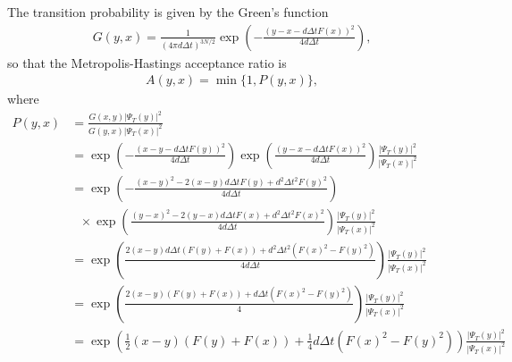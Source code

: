 \documentclass[12pt]{article}
\begin{document}
The transition probability is given by the Green's function
\begin{align}
G(y,x)=\frac{1}{(4\pi d \Delta t)^{3N/2}} \exp \left( -\frac{(y-x-d\Delta t F(x))^2}{4 d \Delta t} \right),
\end{align}
so that the Metropolis-Hastings acceptance ratio is
\begin{align}
A(y,x) = \min \{ 1, P(y,x) \},
\end{align}
where 
\begin{align*}
P(y,x) &= \frac{G(x,y) | \Psi_T(y) | ^2}{G(y,x) | \Psi_T(x) | ^2}\\
&= \exp \left( -\frac{(x-y-d\Delta t F(y))^2}{4 d \Delta t} \right) \exp \left( \frac{(y-x-d\Delta t F(x))^2}{4 d \Delta t} \right) \frac{| \Psi_T(y) | ^2}{ | \Psi_T(x) | ^2}\\
&= \exp \left( -\frac{(x-y)^2-2(x-y)d\Delta t F(y) + d^2 \Delta t^2 F(y)^2}{4d\Delta t} \right)\\
& \ \ \  \times \exp \left( \frac{(y-x)^2-2(y-x)d\Delta t F(x) + d^2 \Delta t^2 F(x)^2}{4d\Delta t} \right) \frac{| \Psi_T(y) | ^2}{ | \Psi_T(x) | ^2}\\
&= \exp \left( \frac{2(x-y)d\Delta t (F(y)+F(x)) + d^2 \Delta t^2 (F(x)^2-F(y)^2)}{4d\Delta t} \right) \frac{| \Psi_T(y) | ^2}{ | \Psi_T(x) | ^2}\\
&= \exp \left( \frac{2(x-y) (F(y)+F(x)) + d \Delta t (F(x)^2-F(y)^2)}{4} \right) \frac{| \Psi_T(y) | ^2}{ | \Psi_T(x) | ^2}\\
&= \exp \left( \frac{1}{2}(x-y) (F(y)+F(x)) + \frac{1}{4} d \Delta t (F(x)^2-F(y)^2) \right) \frac{| \Psi_T(y) | ^2}{ | \Psi_T(x) | ^2}\\
\end{align*}
\end{document}
